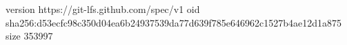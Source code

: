 version https://git-lfs.github.com/spec/v1
oid sha256:d53ecfc98c350d04ea6b24937539da77d639f785e646962c1527b4ae12d1a875
size 353997

